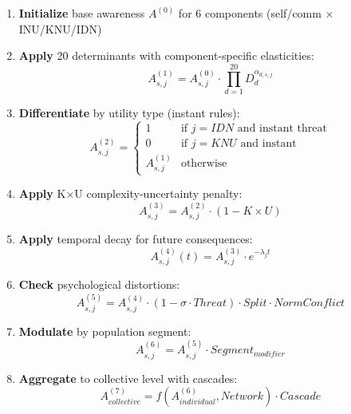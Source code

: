 \begin{enumerate}
    \item \textbf{Initialize} base awareness $A^{(0)}$ for 6 components 
          (self/comm × INU/KNU/IDN)
    
    \item \textbf{Apply} 20 determinants with component-specific elasticities:
    \begin{equation}
    A^{(1)}_{s,j} = A^{(0)}_{s,j} \cdot \prod_{d=1}^{20} D_d^{\alpha_{d,s,j}}
    \end{equation}
    
    \item \textbf{Differentiate} by utility type (instant rules):
    \begin{equation}
    A^{(2)}_{s,j} = \begin{cases}
    1 & \text{if } j = IDN \text{ and instant threat} \\
    0 & \text{if } j = KNU \text{ and instant} \\
    A^{(1)}_{s,j} & \text{otherwise}
    \end{cases}
    \end{equation}
    
    \item \textbf{Apply} K×U complexity-uncertainty penalty:
    \begin{equation}
    A^{(3)}_{s,j} = A^{(2)}_{s,j} \cdot (1 - K \times U)
    \end{equation}
    
    \item \textbf{Apply} temporal decay for future consequences:
    \begin{equation}
    A^{(4)}_{s,j}(t) = A^{(3)}_{s,j} \cdot e^{-\lambda_j t}
    \end{equation}
    
    \item \textbf{Check} psychological distortions:
    \begin{equation}
    A^{(5)}_{s,j} = A^{(4)}_{s,j} \cdot (1 - \sigma \cdot Threat) \cdot Split \cdot NormConflict
    \end{equation}
    
    \item \textbf{Modulate} by population segment:
    \begin{equation}
    A^{(6)}_{s,j} = A^{(5)}_{s,j} \cdot Segment_{modifier}
    \end{equation}
    
    \item \textbf{Aggregate} to collective level with cascades:
    \begin{equation}
    A^{(7)}_{collective} = f(A^{(6)}_{individual}, Network) \cdot Cascade
    \end{equation}
    

\end{enumerate}
